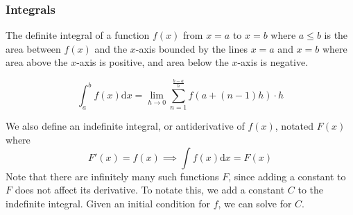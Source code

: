 \subsubsection{Integrals}
The definite integral of a function $f(x)$ from $x=a$ to $x=b$ where $a \leq b$ is the area between $f(x)$ and the $x$-axis bounded by the lines $x=a$ and $x=b$ where area above the $x$-axis is positive, and area below the $x$-axis is negative. 
\begin{definition}
	\begin{equation*}
		\int_{a}^{b}{f(x) \mathrm{d}x} = \lim\limits_{h \to 0}{\sum_{n=1}^{\frac{b-a}{h}}}{f(a + (n-1)h) \cdot h}
	\end{equation*}
\end{definition}

We also define an indefinite integral, or antiderivative of $f(x)$, notated $F(x)$ where
\begin{equation*}
F'(x) = f(x) \implies \int{f(x)\mathrm{d}x} = F(x)
\end{equation*}
Note that there are infinitely many such functions $F$, since adding a constant to $F$ does not affect its derivative. To notate this, we add a constant $C$ to the indefinite integral. Given an initial condition for $f$, we can solve for $C$.\\

